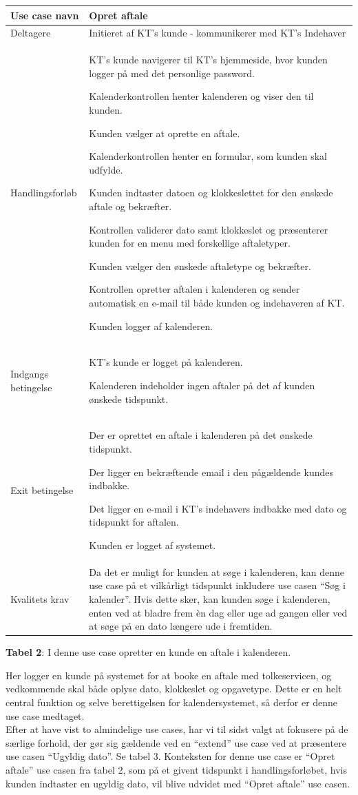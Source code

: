 \documentclass[12pt]{article}   %
\newcommand{\nextitem}{\par\hspace*{\labelsep}\textbullet\hspace*{\labelsep}}
\begin{document}
\hskip-1.0cm\begin{tabular}{l p{11cm}}
Use case navn & Opret aftale \\ \hline
Deltagere & \nextitem Initieret af KT's kunde
            - kommunikerer med KT's Indehaver\\ \hline
Handlingsforløb &
	\nextitem KT's kunde navigerer til KT's hjemmeside, hvor kunden logger
	på med det personlige password.
	\nextitem Kalenderkontrollen henter kalenderen og viser den til
	kunden.
	\nextitem Kunden vælger at oprette en aftale.
	\nextitem Kalenderkontrollen henter en formular, som kunden skal
	udfylde.
	\nextitem Kunden indtaster datoen og klokkeslettet for den ønskede 
	aftale og bekræfter.
	\nextitem Kontrollen validerer dato samt klokkeslet og præsenterer
	kunden for en menu med forskellige aftaletyper.
	\nextitem Kunden vælger den ønskede aftaletype og bekræfter.
	\nextitem Kontrollen opretter aftalen i kalenderen og sender
	automatisk en e-mail til både kunden og indehaveren af KT. 
	\nextitem Kunden logger af kalenderen.
	\\ \hline
	Indgangs betingelse &
		\nextitem KT's kunde er logget på kalenderen. 
		\nextitem Kalenderen indeholder ingen aftaler på det af kunden
		ønskede tidspunkt.
		\\ \hline
Exit betingelse & 
	\nextitem Der er oprettet en aftale i kalenderen på det ønskede
	tidspunkt. 
		\nextitem Der ligger en bekræftende email i den pågældende kundes
			indbakke.
		\nextitem Det ligger en e-mail i KT's indehavers
			indbakke med dato og tidspunkt for aftalen. 
		\nextitem Kunden er logget af systemet.\\ \hline
		Kvalitets krav & Da det er muligt for kunden at søge i kalenderen, kan denne use case på et vilkårligt tidspunkt inkludere use casen  ``Søg i kalender''. Hvis dette sker, kan kunden søge i kalenderen, enten ved at bladre frem èn dag eller uge	ad gangen eller ved at søge på en dato længere ude i fremtiden.\\ \hline
\end{tabular}
\begin{center}
\textbf{Tabel 2}: I denne use case opretter en kunde en aftale i kalenderen.
\end{center}
\vspace{0.5cm}

Her logger en kunde på systemet for at booke en aftale med tolkeservicen, og vedkommende skal både oplyse dato, klokkeslet og opgavetype. Dette er en helt central funktion og selve berettigelsen for kalendersystemet, så derfor er denne use case medtaget.\\
Efter at have vist to almindelige use cases, har vi til sidst valgt at fokusere på de særlige forhold, der gør sig gældende ved en ``extend'' use case ved at præsentere use casen ``Ugyldig dato''. Se tabel 3. Konteksten for denne use case er ``Opret aftale'' use casen fra tabel 2, som på et givent tidspunkt i handlingsforløbet, hvis kunden indtaster en ugyldig dato, vil blive udvidet med ``Opret aftale'' use casen. \\
\end{document}
